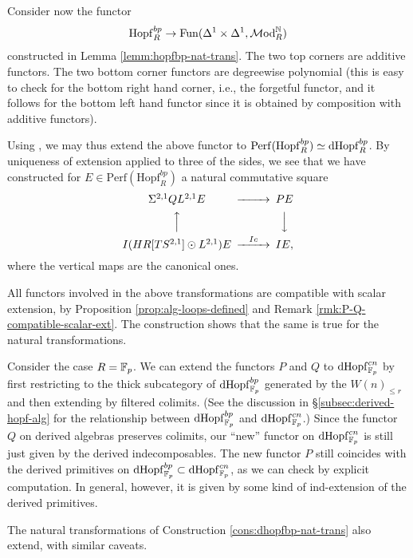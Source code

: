\documentclass{amsart}
\renewcommand{\NB}[1]{}
\numberwithin{proposition}{section}
\numberwithin{equation}{section}
\def\Hopf{\mathrm{Hopf}}
\def\dHopf{\mathrm{dHopf}}
\def\Hopf{\mathrm{Hopf}}
\def\Perf{\mathrm{Perf}}
\def\hotimes{\odot}
\def\hLoops{L}
\begin{document}
Consider now the functor \[ \Hopf_R^{bp} \to \Fun(\Delta^1 \times \Delta^1, \Mod_R^\N) \] constructed in Lemma \ref{lemm:hopfbp-nat-trans}.
The two top corners are additive functors.
The two bottom corner functors are degreewise polynomial (this is easy to check for the bottom right hand corner, i.e., the forgetful functor, and it follows for the bottom left hand functor since it is obtained by composition with additive functors).
\begin{construction}\label{cons:dhopfbp-nat-trans}
Using \cite[Theorem 2.19]{k-theory-and-poly-functors}, we may thus extend the above functor to $\Perf(\Hopf_R^{bp}) \wequi \dHopf_R^{bp}$.
By uniqueness of extension applied to three of the sides, we see that we have constructed for $E \in \Perf(\Hopf_R^{bp})$ a natural commutative square
\begin{equation*}
\begin{CD}
\Sigma^{2,1}Q\hLoops^{2,1}E @>>> PE \\
@AAA                       @VVV \\
I(HR[TS^{2,1}] \hotimes\hLoops^{2,1})E @>Ic>> IE,
\end{CD}
\end{equation*}
where the vertical maps are the canonical ones.
\end{construction}

\begin{remark} \label{rmk:c-compat-scalar-extn}
All functors involved in the above transformations are compatible with scalar extension, by Proposition \ref{prop:alg-loops-defined} and Remark \ref{rmk:P-Q-compatible-scalar-ext}.
The construction shows that the same is true for the natural transformations.
\end{remark}

\begin{remark}
Consider the case $R=\mathbb{F}_p$.
We can extend the functors $P$ and $Q$ to $\dHopf^{cn}_{\F_p}$ by first restricting to the thick subcategory of $\dHopf_{\F_p}^{bp}$ generated by the $W(n)_{\le r}$ and then extending by filtered colimits.
(See the discussion in \S\ref{subsec:derived-hopf-alg} for the relationship between $\dHopf_{\F_p}^{bp}$ and $\dHopf^{cn}_{\F_p}$.)
Since the functor $Q$ on derived algebras preserves colimits, our ``new'' functor on $\dHopf^{cn}_{\F_p}$ is still just given by the derived indecomposables.
The new functor $P$ still coincides with the derived primitives on $\dHopf_{\F_p}^{bp} \subset \dHopf^{cn}_{\F_p}$, as we can check by explicit computation.\NB{details?}
In general, however, it is given by some kind of ind-extension of the derived primitives.

The natural transformations of Construction \ref{cons:dhopfbp-nat-trans} also extend, with similar caveats.
\end{remark}
\end{document}
